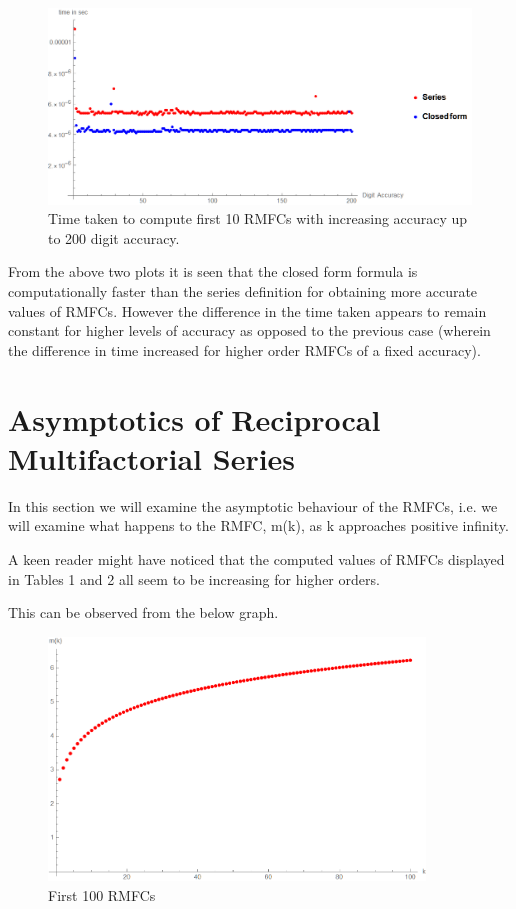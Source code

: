 \documentclass[12pt]{article}
\numberwithin{equation}{section}
\begin{document}
\begin{figure}[!hbp]
    \centering
    \includegraphics[width=13cm]{Images/first200digitsaccuracy.png}
    \caption{Time taken to compute first 10 RMFCs with increasing accuracy up to 200 digit accuracy.}
    \label{fig:timecomp10rmfc200digit}
\end{figure}\par
From the above two plots it is seen that the closed form formula is computationally faster than the series definition for obtaining more accurate values of RMFCs. However the difference in the time taken appears to remain constant for higher levels of accuracy as opposed to the previous case (wherein the difference in time increased for higher order RMFCs of a fixed accuracy).


\section{Asymptotics of Reciprocal Multifactorial Series}
\par In this section we will examine the asymptotic behaviour of the RMFCs, i.e. we will examine what happens to the RMFC, m(k), as k approaches positive infinity.
\par A keen reader might have noticed that the computed values of RMFCs displayed in Tables 1 and 2 all seem to be increasing for higher orders.
\par This can be observed from the below graph.
\begin{figure}[!hbp]
    \centering
    \includegraphics[width=10cm]{Images/first100RMFCs.png}
    \caption{First 100 RMFCs}
    \label{fig:first100rmfcs}
\end{figure}
\end{document}
